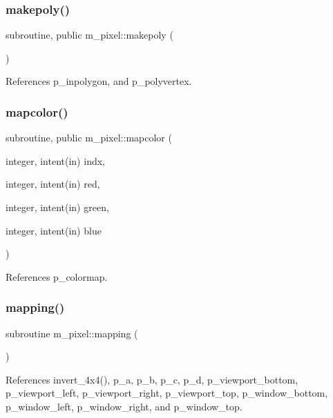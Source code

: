 \subsubsection{\texorpdfstring{makepoly()}{makepoly()}}
{\footnotesize\ttfamily subroutine, public m\+\_\+pixel\+::makepoly (\begin{DoxyParamCaption}{ }\end{DoxyParamCaption})}



References p\+\_\+inpolygon, and p\+\_\+polyvertex.

\mbox{\label{namespacem__pixel_a3422f51171f30979868a8075690da9f5}} 
\subsubsection{\texorpdfstring{mapcolor()}{mapcolor()}}
{\footnotesize\ttfamily subroutine, public m\+\_\+pixel\+::mapcolor (\begin{DoxyParamCaption}\item[{integer, intent(in)}]{indx,  }\item[{integer, intent(in)}]{red,  }\item[{integer, intent(in)}]{green,  }\item[{integer, intent(in)}]{blue }\end{DoxyParamCaption})}



References p\+\_\+colormap.

\mbox{\label{namespacem__pixel_a84c841de62fc0addddeff305c4ede9d4}} 
\subsubsection{\texorpdfstring{mapping()}{mapping()}}
{\footnotesize\ttfamily subroutine m\+\_\+pixel\+::mapping (\begin{DoxyParamCaption}{ }\end{DoxyParamCaption})\hspace{0.3cm}{\ttfamily [private]}}



References invert\+\_\+4x4(), p\+\_\+a, p\+\_\+b, p\+\_\+c, p\+\_\+d, p\+\_\+viewport\+\_\+bottom, p\+\_\+viewport\+\_\+left, p\+\_\+viewport\+\_\+right, p\+\_\+viewport\+\_\+top, p\+\_\+window\+\_\+bottom, p\+\_\+window\+\_\+left, p\+\_\+window\+\_\+right, and p\+\_\+window\+\_\+top.

